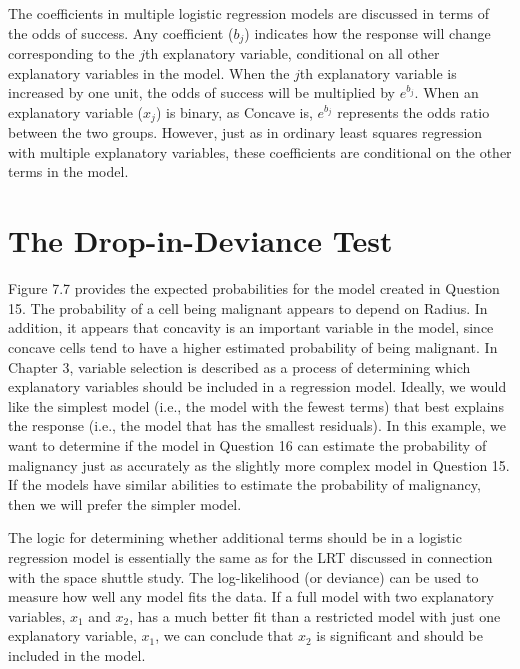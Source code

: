 \documentclass[
]{report}
\begin{document}
The coefficients in multiple logistic regression models are discussed in terms of the odds of success. Any coefficient (\(b_j\)) indicates how the response will change corresponding to the \(j\)th explanatory variable, conditional on all other explanatory variables in the model. When the \(j\)th explanatory variable is increased by one unit, the odds of success will be multiplied by \(e^{b_j}\). When an explanatory variable (\(x_j\)) is binary, as Concave is, \(e^{b_j}\) represents the odds ratio between the two groups. However, just as in ordinary least squares regression with multiple explanatory variables, these coefficients are conditional on the other terms in the model.

\hypertarget{the-drop-in-deviance-test-1}{%
\section{\texorpdfstring{\textbf{The Drop-in-Deviance Test}}{The Drop-in-Deviance Test}}\label{the-drop-in-deviance-test-1}}

Figure 7.7 provides the expected probabilities for the model created in Question 15. The probability of a cell being malignant appears to depend on Radius. In addition, it appears that concavity is an important variable in the model, since concave cells tend to have a higher estimated probability of being malignant. In Chapter 3, variable selection is described as a process of determining which explanatory variables should be included in a regression model. Ideally, we would like the simplest model (i.e., the model with the fewest terms) that best explains the response (i.e., the model that has the smallest residuals). In this example, we want to determine if the model in Question 16 can estimate the probability of malignancy just as accurately as the slightly more complex model in Question 15. If the models have similar abilities to estimate the probability of malignancy, then we will prefer the simpler model.

The logic for determining whether additional terms should be in a logistic regression model is essentially the same as for the LRT discussed in connection with the space shuttle study. The log-likelihood (or deviance) can be used to measure how well any model fits the data. If a full model with two explanatory variables, \(x_1\) and \(x_2\), has a much better fit than a restricted model with just one explanatory variable, \(x_1\), we can conclude that \(x_2\) is significant and should be included in the model.
\end{document}
